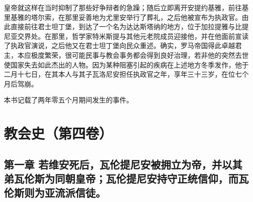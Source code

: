 皇帝就这样在当时抑制了那些好争辩者的急躁；随后立即离开安提约基雅，前往基里基雅的塔尔索，在那里妥善地为尤里安举行了葬礼，之后他被宣布为执政官。由此直接前往君士坦丁堡，到达了一个名为达达斯塔纳的地方，位于加拉提雅与比提尼亚交界处。在那里，哲学家特米斯提与其他元老院成员迎接他，并在他面前宣读了执政官演说，之后他又在君士坦丁堡向民众重述。确实，罗马帝国得此卓越君主，本应极度繁荣，很可能民事与教会事务都会得到良好治理，若非他的突然去世使国家失去如此杰出的人物。因为某种阻塞引起的疾病在上述地方冬季发作，他于二月十七日，在其本人与其子瓦洛尼安担任执政官之年，享年三十三岁，在位七个月后驾崩。\par

本书记载了两年零五个月期间发生的事件。\par



\section{教会史（第四卷）}


\subsection{第一章 若维安死后，瓦伦提尼安被拥立为帝，并以其弟瓦伦斯为同朝皇帝；瓦伦提尼安持守正统信仰，而瓦伦斯则为亚流派信徒。}

